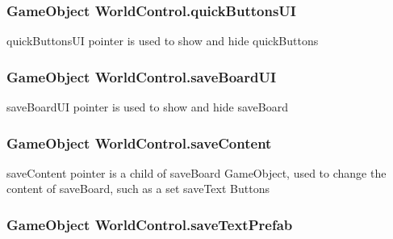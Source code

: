 \subsubsection[{\texorpdfstring{quick\+Buttons\+UI}{quickButtonsUI}}]{\setlength{\rightskip}{0pt plus 5cm}Game\+Object World\+Control.\+quick\+Buttons\+UI}\hypertarget{class_world_control_a753656d6a6074ef842b3fe2717479883}{}\label{class_world_control_a753656d6a6074ef842b3fe2717479883}


quick\+Buttons\+UI pointer is used to show and hide quick\+Buttons 

\subsubsection[{\texorpdfstring{save\+Board\+UI}{saveBoardUI}}]{\setlength{\rightskip}{0pt plus 5cm}Game\+Object World\+Control.\+save\+Board\+UI}\hypertarget{class_world_control_a360d0b5243a0e9e56e4ad31944e67c0e}{}\label{class_world_control_a360d0b5243a0e9e56e4ad31944e67c0e}


save\+Board\+UI pointer is used to show and hide save\+Board 

\subsubsection[{\texorpdfstring{save\+Content}{saveContent}}]{\setlength{\rightskip}{0pt plus 5cm}Game\+Object World\+Control.\+save\+Content}\hypertarget{class_world_control_a09d1ec3cec5f522a00f22650133b9e7b}{}\label{class_world_control_a09d1ec3cec5f522a00f22650133b9e7b}


save\+Content pointer is a child of save\+Board Game\+Object, used to change the content of save\+Board, such as a set save\+Text Buttons 

\subsubsection[{\texorpdfstring{save\+Text\+Prefab}{saveTextPrefab}}]{\setlength{\rightskip}{0pt plus 5cm}Game\+Object World\+Control.\+save\+Text\+Prefab}\hypertarget{class_world_control_a83c0fc4db2fd739e7b02f2a77b772b57}{}\label{class_world_control_a83c0fc4db2fd739e7b02f2a77b772b57}


